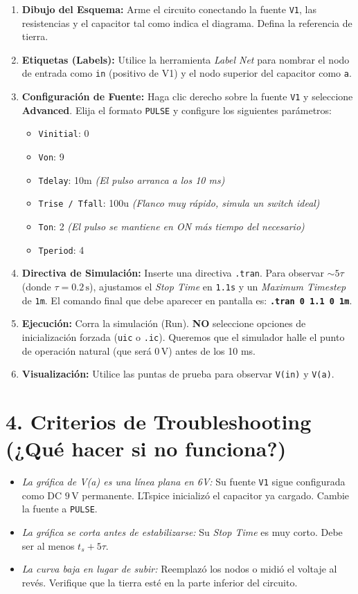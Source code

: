 \documentclass[11pt, a4paper]{article}
\begin{document}
\begin{enumerate}
    \item \textbf{Dibujo del Esquema:} Arme el circuito conectando la fuente \texttt{V1}, las resistencias y el capacitor tal como indica el diagrama. Defina la referencia de tierra.
    \item \textbf{Etiquetas (Labels):} Utilice la herramienta \textit{Label Net} para nombrar el nodo de entrada como \texttt{in} (positivo de V1) y el nodo superior del capacitor como \texttt{a}.
    \item \textbf{Configuración de Fuente:} Haga clic derecho sobre la fuente \texttt{V1} y seleccione \textbf{Advanced}. Elija el formato \texttt{PULSE} y configure los siguientes parámetros:
    \begin{itemize}
        \item \texttt{Vinitial}: 0
        \item \texttt{Von}: 9
        \item \texttt{Tdelay}: 10m \textit{(El pulso arranca a los 10 ms)}
        \item \texttt{Trise / Tfall}: 100u \textit{(Flanco muy rápido, simula un switch ideal)}
        \item \texttt{Ton}: 2 \textit{(El pulso se mantiene en ON más tiempo del necesario)}
        \item \texttt{Tperiod}: 4
    \end{itemize}
    \item \textbf{Directiva de Simulación:} Inserte una directiva \texttt{.tran}. Para observar $\sim 5\tau$ (donde $\tau=0.2\,\text{s}$), ajustamos el \textit{Stop Time} en \texttt{1.1s} y un \textit{Maximum Timestep} de \texttt{1m}. El comando final que debe aparecer en pantalla es: \textbf{\texttt{.tran 0 1.1 0 1m}}.
    \item \textbf{Ejecución:} Corra la simulación (Run). \textbf{NO} seleccione opciones de inicialización forzada (\texttt{uic} o \texttt{.ic}). Queremos que el simulador halle el punto de operación natural (que será $0\,\text{V}$) antes de los 10 ms.
    \item \textbf{Visualización:} Utilice las puntas de prueba para observar \texttt{V(in)} y \texttt{V(a)}.
\end{enumerate}

\section*{4. Criterios de Troubleshooting (¿Qué hacer si no funciona?)}
\begin{itemize}
    \item \textit{La gráfica de V(a) es una línea plana en 6V:} Su fuente \texttt{V1} sigue configurada como DC $9\,\text{V}$ permanente. LTspice inicializó el capacitor ya cargado. Cambie la fuente a \texttt{PULSE}.
    \item \textit{La gráfica se corta antes de estabilizarse:} Su \textit{Stop Time} es muy corto. Debe ser al menos $t_s + 5\tau$.
    \item \textit{La curva baja en lugar de subir:} Reemplazó los nodos o midió el voltaje al revés. Verifique que la tierra esté en la parte inferior del circuito.
\end{itemize}
\end{document}
